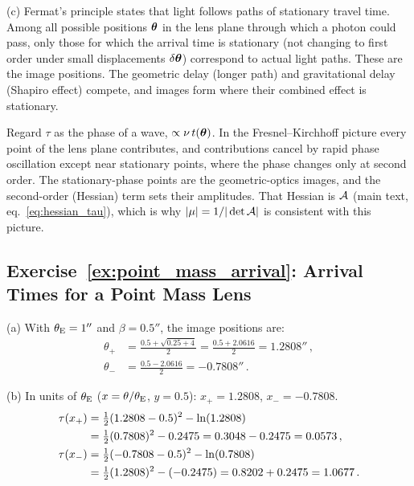 (c) Fermat's principle states that light follows
paths of stationary travel time.  Among all possible positions
$\boldsymbol{\theta}$ in the lens plane through which a photon could pass, only
those for which the arrival time is stationary (not changing to first
order under small displacements $\delta\boldsymbol{\theta}$) correspond to actual
light paths.  These are the image positions.  The geometric delay
(longer path) and gravitational delay (Shapiro effect) compete, and
images form where their combined effect is stationary.

\begin{annotation}
Regard $\tau$ as the phase of a wave, $\propto\nu\,t(\boldsymbol{\theta})$.  In the
Fresnel--Kirchhoff picture every point of the lens plane contributes, and
contributions cancel by rapid phase oscillation except near stationary
points, where the phase changes only at second order.  The stationary-phase
points are the geometric-optics images, and the second-order (Hessian)
term sets their amplitudes.  That Hessian is $\mathcal{A}$ (main text,
eq.~\eqref{eq:hessian_tau}), which is why $|\mu| = 1/|\det\mathcal{A}|$ is
consistent with this picture.
\end{annotation}

\subsection*{Exercise~\ref{ex:point_mass_arrival}: Arrival Times for a Point Mass Lens}

(a) With $\theta_{\mathrm{E}} = 1''$ and $\beta = 0.5''$, the image
positions are:
\begin{align*}
    \theta_+ &= \frac{0.5 + \sqrt{0.25 + 4}}{2}
    = \frac{0.5 + 2.0616}{2} = 1.2808'' \,, \\
    \theta_- &= \frac{0.5 - 2.0616}{2} = -0.7808'' \,.
\end{align*}

(b) In units of $\theta_{\mathrm{E}}$ ($x = \theta/\theta_{\mathrm{E}}$, $y = 0.5$):
$x_+ = 1.2808$, $x_- = -0.7808$.
\begin{align*}
    \tau(x_+) &= \tfrac{1}{2}(1.2808 - 0.5)^2 - \ln(1.2808) \\
    &= \tfrac{1}{2}(0.7808)^2 - 0.2475
    = 0.3048 - 0.2475 = 0.0573 \,, \\
    \tau(x_-) &= \tfrac{1}{2}(-0.7808 - 0.5)^2 - \ln(0.7808) \\
    &= \tfrac{1}{2}(1.2808)^2 - (-0.2475)
    = 0.8202 + 0.2475 = 1.0677 \,.
\end{align*}

